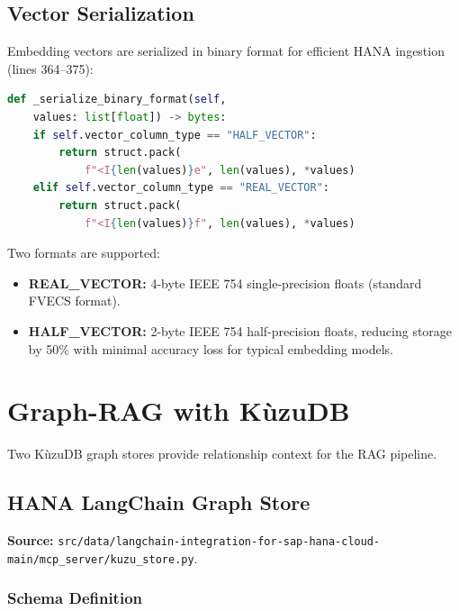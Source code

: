 \documentclass[11pt]{article}
\begin{document}
\subsection{Vector Serialization}

Embedding vectors are serialized in binary format for efficient HANA ingestion
(lines 364--375):

\begin{lstlisting}[language=Python,caption={Binary serialization --- lines 364--375}]
def _serialize_binary_format(self,
    values: list[float]) -> bytes:
    if self.vector_column_type == "HALF_VECTOR":
        return struct.pack(
            f"<I{len(values)}e", len(values), *values)
    elif self.vector_column_type == "REAL_VECTOR":
        return struct.pack(
            f"<I{len(values)}f", len(values), *values)
\end{lstlisting}

Two formats are supported:
\begin{itemize}
  \item \textbf{REAL\_VECTOR:} 4-byte IEEE 754 single-precision floats (standard
        FVECS format).
  \item \textbf{HALF\_VECTOR:} 2-byte IEEE 754 half-precision floats, reducing
        storage by 50\% with minimal accuracy loss for typical embedding models.
\end{itemize}

\section{Graph-RAG with KùzuDB}
\label{sec:graph-rag}

Two KùzuDB graph stores provide relationship context for the RAG pipeline.

\subsection{HANA LangChain Graph Store}

\noindent\textbf{Source:}
\texttt{src/data/langchain-integration-for-sap-hana-cloud-main/mcp\_server/kuzu\_store.py}.

\subsubsection{Schema Definition}
\end{document}
